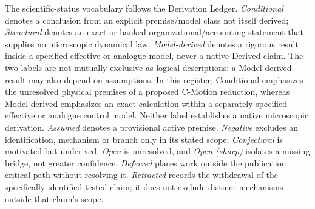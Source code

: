 \documentclass[11pt]{article}
\theoremstyle{definition}
\begin{document}
The scientific-status vocabulary follows the Derivation Ledger.
\emph{Conditional} denotes a conclusion from an explicit premise/model class
not itself derived; \emph{Structural} denotes an exact or banked
organizational/accounting statement that supplies no microscopic dynamical law.
\emph{Model-derived} denotes a rigorous result inside a specified effective
or analogue model, never a native Derived claim.
The two labels are not mutually exclusive as logical descriptions:
a Model-derived result may also depend on assumptions.  In this
register, Conditional emphasizes the unresolved physical premises
of a proposed C-Motion reduction, whereas Model-derived emphasizes
an exact calculation within a separately specified effective or
analogue control model.  Neither label establishes a native
microscopic derivation. \emph{Assumed} denotes a provisional active premise.
 \emph{Negative} excludes an identification, mechanism or branch
 only in its stated scope; \emph{Conjectural} is motivated
but underived. \emph{Open} is unresolved, and \emph{Open (sharp)} isolates
a missing bridge, not greater confidence. \emph{Deferred} places work outside
the publication critical path without resolving it. \emph{Retracted} records
the withdrawal of the specifically identified tested claim; it does not
exclude distinct mechanisms outside that claim's scope.
\end{document}
